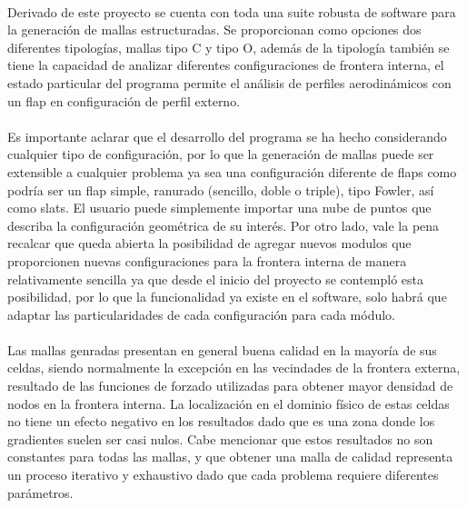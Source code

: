 \documentclass[letterpaper, openright, 12pt]{book}
\begin{document}
\paragraph*{}
    Derivado de este proyecto se cuenta con toda una suite robusta de software
    para la generación de mallas estructuradas. Se proporcionan como opciones
    dos diferentes tipologías, mallas tipo C y tipo O, además de la tipología
    también se tiene la capacidad de analizar diferentes configuraciones de
    frontera interna, el estado particular del programa permite el análisis de
    perfiles aerodinámicos con un flap en configuración de perfil externo.

\paragraph*{}
    Es importante aclarar que el desarrollo del programa se ha hecho
    considerando cualquier tipo de configuración, por lo que la generación de
    mallas puede ser extensible a cualquier problema ya sea una configuración
    diferente de flaps como podría ser un flap simple, ranurado (sencillo,
    doble o triple), tipo Fowler, así como slats. El usuario puede simplemente
    importar una nube de puntos que describa la configuración geométrica de su
    interés. Por otro lado, vale la pena recalcar que queda abierta la
    posibilidad de agregar nuevos modulos que proporcionen nuevas
    configuraciones para la frontera interna de manera relativamente sencilla
    ya que desde el inicio del proyecto se contempló esta posibilidad, por lo
    que la funcionalidad ya existe en el software, solo habrá que adaptar las
    particularidades de cada configuración para cada módulo.

\paragraph*{}
    Las mallas genradas presentan en general buena calidad en la mayoría de sus
    celdas, siendo normalmente la excepción en las vecindades de la frontera
    externa, resultado de las funciones de forzado utilizadas para obtener
    mayor densidad de nodos en la frontera interna. La localización en el
    dominio físico de estas celdas no tiene un efecto negativo en los
    resultados dado que es una zona donde los gradientes suelen ser casi nulos.
    Cabe mencionar que estos resultados no son constantes para todas las
    mallas, y que obtener una malla de calidad representa un proceso iterativo
    y exhaustivo dado que cada problema requiere diferentes parámetros.
\end{document}
